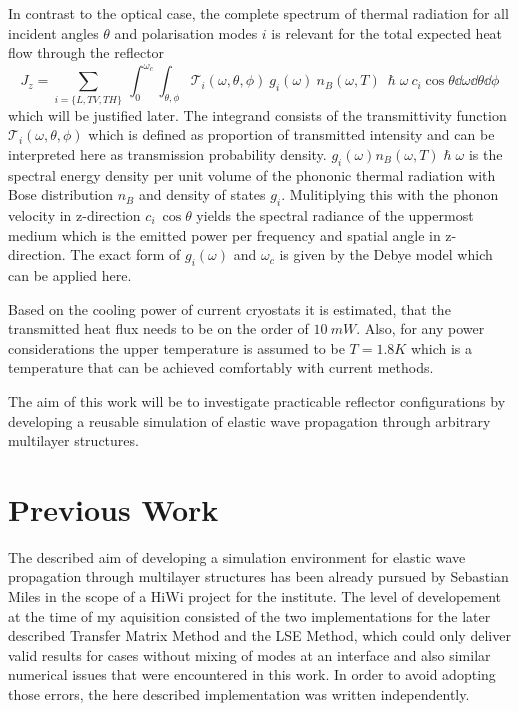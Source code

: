 In contrast to the optical case, the complete spectrum of thermal
radiation for all incident angles $\theta$ and polarisation modes $i$ is
relevant for the total expected heat flow through the reflector
\begin{equation} \label{eq:totalheatflow}
    J_z = \sum\limits_{i=\{L,TV,TH\}}\ \int_0^{\omega_c}\int_{\theta, \phi}
    \mathcal{T}_i(\omega, \theta, \phi)\ g_i(\omega)\ n_B(\omega, T)\
    \hslash \omega\  c_i\cos \theta \dd{\omega} \dd{\theta}\dd{\phi}
\end{equation}
which will be justified later. The integrand
consists of the transmittivity function $\mathcal{T}_i(\omega, \theta, \phi)$
which is defined as proportion of transmitted intensity and can be interpreted
here as transmission probability density. $g_i(\omega)
    n_B(\omega,T)\hslash\omega$ is the spectral energy density per unit volume
of the phononic thermal radiation with Bose distribution $n_B$ and density of
states $g_i$. Mulitiplying this with the phonon velocity in z-direction $c_i\
    \cos\theta$ yields the spectral radiance of the uppermost medium which is
the emitted power per frequency and spatial angle in z-direction. The exact
form of $g_i(\omega)$ and $\omega_c$ is given by the Debye model which can be
applied here.

Based on the cooling power of current cryostats it is estimated, that the
transmitted heat flux needs to be on the order of $10\ \si{mW}$. Also,
for any power considerations the upper temperature is assumed to be
$T=1.8\si{K}$
which is a temperature that can be achieved comfortably with current methods.

The aim of this work will be to investigate practicable reflector
configurations by developing a reusable simulation of elastic wave propagation
through arbitrary multilayer structures.  %

\section{Previous Work}
The described aim of developing a simulation environment for elastic wave
propagation through multilayer structures has been already pursued by Sebastian
Miles in the scope of a HiWi project for the institute. The level of
developement at the time of my aquisition consisted of the two
implementations for the later described Transfer Matrix Method and the LSE
Method, which could only deliver valid results for cases without mixing of
modes at an interface and also similar numerical issues that were encountered
in this work. In order to avoid adopting those errors, the here described
implementation was written independently.


